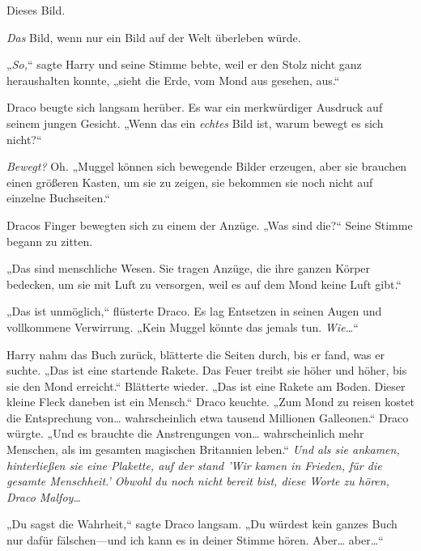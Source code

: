 {Dieses Bild.

\emph{Das} Bild, wenn nur ein Bild auf der Welt überleben würde.

„\emph{So,}“ sagte Harry und seine Stimme bebte, weil er den Stolz nicht ganz heraushalten konnte, „sieht die Erde, vom Mond aus gesehen, aus.“

Draco beugte sich langsam herüber. Es war ein merkwürdiger Ausdruck auf seinem jungen Gesicht. „Wenn das ein \emph{echtes} Bild ist, warum bewegt es sich nicht?“

\emph{Bewegt?} Oh. „Muggel können sich bewegende Bilder erzeugen, aber sie brauchen einen größeren Kasten, um sie zu zeigen, sie bekommen sie noch nicht auf einzelne Buchseiten.“

Dracos Finger bewegten sich zu einem der Anzüge. „Was sind die?“ Seine Stimme begann zu zitten.

„Das sind menschliche Wesen. Sie tragen Anzüge, die ihre ganzen Körper bedecken, um sie mit Luft zu versorgen, weil es auf dem Mond keine Luft gibt.“

„Das ist unmöglich,“ flüsterte Draco. Es lag Entsetzen in seinen Augen und vollkommene Verwirrung. „Kein Muggel könnte das jemals tun. \emph{Wie…}“

Harry nahm das Buch zurück, blätterte die Seiten durch, bis er fand, was er suchte. „Das ist eine startende Rakete. Das Feuer treibt sie höher und höher, bis sie den Mond erreicht.“ Blätterte wieder. „Das ist eine Rakete am Boden. Dieser kleine Fleck daneben ist ein Mensch.“ Draco keuchte. „Zum Mond zu reisen kostet die Entsprechung von… wahrscheinlich etwa tausend Millionen Galleonen.“ Draco würgte. „Und es brauchte die Anstrengungen von… wahrscheinlich mehr Menschen, als im gesamten magischen Britannien leben.“ \emph{Und als sie ankamen, hinterließen sie eine Plakette, auf der stand 'Wir kamen in Frieden, für die gesamte Menschheit.' Obwohl du noch nicht bereit bist, diese Worte zu hören, Draco Malfoy…}

„Du sagst die Wahrheit,“ sagte Draco langsam. „Du würdest kein ganzes Buch nur dafür fälschen—und ich kann es in deiner Stimme hören. Aber… aber…“

}
